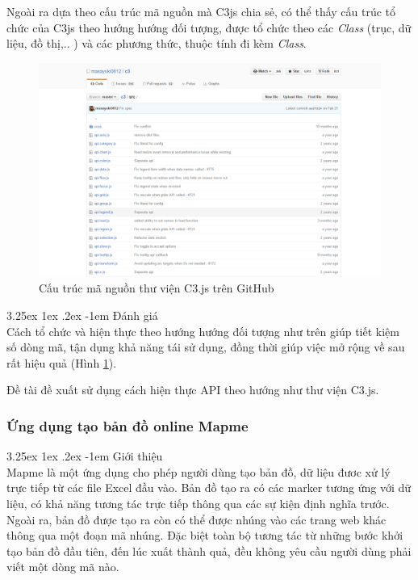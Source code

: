 \documentclass[12pt,a4paper,twoside]{article}
\makeatletter
\newcommand{\myparagraph}[1]{\paragraph{#1}\mbox{}\\} %
\renewcommand\paragraph{\@startsection{paragraph}{5}{\z@}%
  {3.25ex \@plus1ex \@minus.2ex}%
  {-1em}%
  {\normalfont\normalsize\bfseries}}
\makeatother
\begin{document}
Ngoài ra dựa theo cấu trúc mã nguồn mà C3js chia sẻ, có thể thấy cấu trúc tổ chức của C3js theo hướng hướng đối tượng, được tổ chức theo các \textit{Class} (trục, dữ liệu, đồ thị,.. ) và các phương thức, thuộc tính đi kèm \textit{Class}.

\begin{figure}[!h]
	\begin{center}
    \includegraphics[scale=.4]{image/c3source}
    \caption{Cấu trúc mã nguồn thư viện C3.js trên GitHub}
    \label{fig:c3source}
	\end{center}
\end{figure}

\myparagraph{Đánh giá}
Cách tổ chức và hiện thực theo hướng hướng đối tượng như trên giúp tiết kiệm số dòng mã, tận dụng khả năng tái sử dụng, đồng thời giúp việc mở rộng về sau rất hiệu quả (Hình \ref{fig:c3source}).

Đề tài đề xuất sử dụng cách hiện thực API theo hướng như thư viện C3.js.

\subsubsection{Ứng dụng tạo bản đồ online Mapme}
\myparagraph{Giới thiệu}
Mapme\cite{mapme} là một ứng dụng cho phép người dùng tạo bản đồ, dữ liệu đươc xử lý trực tiếp từ các file Excel đầu vào. Bản đồ tạo ra có các marker tương ứng với dữ liệu, có khả năng tương tác trực tiếp thông qua các sự kiện định nghĩa trước. Ngoài ra, bản đồ được tạo ra còn có thể được nhúng vào các trang web khác thông qua một đoạn mã nhúng. Đặc biệt toàn bộ tương tác từ những bước khởi tạo bản đồ đầu tiên, đến lúc xuất thành quả, đều không yêu cầu người dùng phải viết một dòng mã nào.
\end{document}
